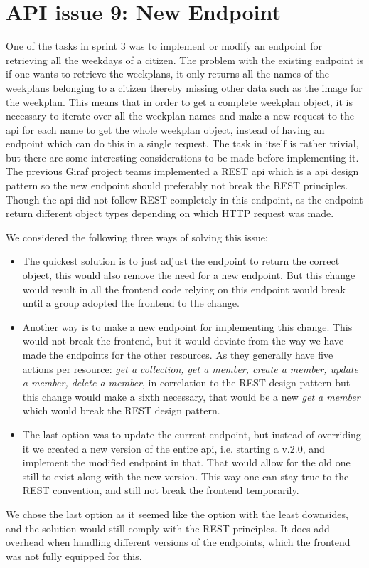 \section{API issue 9: New Endpoint} \label{sec:webIssue9}

One of the tasks in sprint 3 was to implement or modify an endpoint for retrieving all the weekdays of a citizen. The problem with the existing endpoint is if one wants to retrieve the weekplans, it only returns all the names of the weekplans belonging to a citizen thereby missing other data such as the image for the weekplan. This means that in order to get a complete weekplan object, it is necessary to iterate over all the weekplan names and make a new request to the api for each name to get the whole weekplan object, instead of having an endpoint which can do this in a single request. 
The task in itself is rather trivial, but there are some interesting considerations to be made before implementing it. The previous Giraf project teams implemented a REST \gls{api} which is a \gls{api} design pattern so the new endpoint should preferably not break the REST principles. Though the \gls{api} did not follow REST completely in this endpoint, as the endpoint return different object types depending on which HTTP request was made. 

We considered the following three ways of solving this issue:
\begin{itemize}
\item The quickest solution is to just adjust the endpoint to return the correct object, this would also remove the need for a new endpoint. But this change would result in all the frontend code relying on this endpoint would break until a group adopted the frontend to the change.
\item Another way is to make a new endpoint for implementing this change. This would not break the frontend, but it would deviate from the way we have made the endpoints for the other resources. As they generally have five actions per resource: \textit{get a collection, get a member, create a member, update a member, delete a member},  in correlation to the REST design pattern but this change would make a sixth necessary, that would be a new \textit{get a member} which would break the REST design pattern.
\item The last option was to update the current endpoint, but instead of overriding it we created a new version of the entire \gls{api}, i.e. starting a v.2.0, and implement the modified endpoint in that. That would allow for the old one still to exist along with the new version. This way one can stay true to the REST convention, and still not break the frontend temporarily.
\end{itemize}

We chose the last option as it seemed like the option with the least downsides, and the solution would still comply with the REST principles. It does add overhead when handling different versions of the endpoints, which the frontend was not fully equipped for this.

